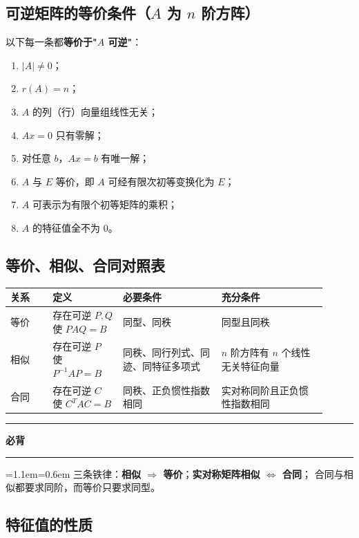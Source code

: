 \documentclass[11pt,openany,UTF8]{ctexbook}
\newcommand{\callouthead}[2]{%
  \par\addvspace{7pt}\noindent
  {\color{#1}\rule[-0.15em]{3pt}{1.05em}}\hspace{0.5em}%
  {\bfseries\color{#1}#2}\par\nobreak\vspace{-0.35em}%
  {\color{rulesep}\hrule height 0.4pt}\nobreak\vspace{0.45em}%
  \begingroup\small\setlength{\parindent}{0pt}%
  \leftskip=1.1em\rightskip=0.6em\noindent\ignorespaces}
\newcommand{\calloutend}{\par\endgroup\addvspace{7pt}}
\newenvironment{callkey}[1]{\callouthead{keybar}{#1}}{\calloutend}
\begin{document}
\subsection{可逆矩阵的等价条件（$A$ 为 $n$ 阶方阵）}

以下每一条都\textbf{等价于"$A$ 可逆"}：

\begin{enumerate}
\item $\lvert A\rvert\ne0$；
\item $r(A)=n$；
\item $A$ 的列（行）向量组线性无关；
\item $Ax=0$ 只有零解；
\item 对任意 $b$，$Ax=b$ 有唯一解；
\item $A$ 与 $E$ 等价，即 $A$ 可经有限次初等变换化为 $E$；
\item $A$ 可表示为有限个初等矩阵的乘积；
\item $A$ 的特征值全不为 $0$。
\end{enumerate}
\subsection{等价、相似、合同对照表}

\begingroup\small\setlength{\tabcolsep}{4.0pt}
\begin{longtable}{@{}L{0.1236\linewidth}L{0.2008\linewidth}L{0.2858\linewidth}L{0.3012\linewidth}@{}}
\toprule
\textbf{关系} & \textbf{定义} & \textbf{必要条件} & \textbf{充分条件} \\
\midrule
\endhead
等价 & 存在可逆 $P,Q$ 使 $PAQ=B$ & 同型、同秩 & 同型且同秩 \\
相似 & 存在可逆 $P$ 使 $P^{-1}AP=B$ & 同秩、同行列式、同迹、同特征多项式 & $n$ 阶方阵有 $n$ 个线性无关特征向量 \\
合同 & 存在可逆 $C$ 使 $C^TAC=B$ & 同秩、正负惯性指数相同 & 实对称同阶且正负惯性指数相同 \\
\bottomrule
\end{longtable}
\endgroup

\begin{callkey}{必背}
三条铁律：\textbf{相似 $\Rightarrow$ 等价}；\textbf{实对称矩阵相似 $\iff$ 合同}； 合同与相似都要求同阶，而等价只要求同型。

\end{callkey}

\subsection{特征值的性质}
\end{document}
